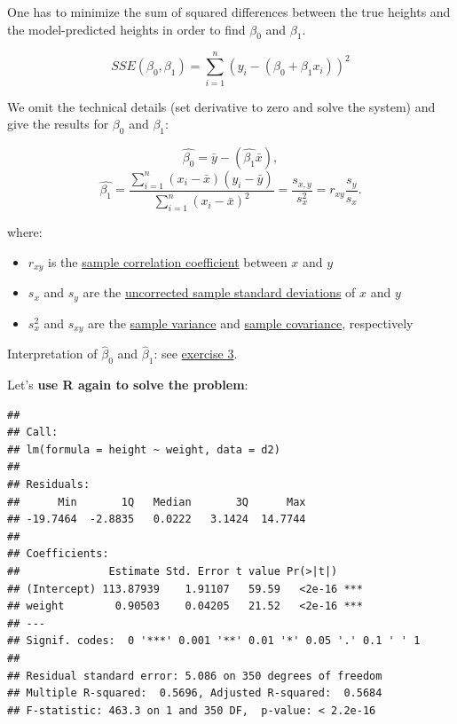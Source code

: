 \documentclass[
]{book}
\newenvironment{Shaded}{\begin{snugshade}}{\end{snugshade}}
\newcommand{\AttributeTok}[1]{\textcolor[rgb]{0.13,0.29,0.53}{#1}}
\newcommand{\DecValTok}[1]{\textcolor[rgb]{0.00,0.00,0.81}{#1}}
\newcommand{\FunctionTok}[1]{\textcolor[rgb]{0.13,0.29,0.53}{\textbf{#1}}}
\newcommand{\NormalTok}[1]{#1}
\newcommand{\OtherTok}[1]{\textcolor[rgb]{0.56,0.35,0.01}{#1}}
\newcommand{\SpecialCharTok}[1]{\textcolor[rgb]{0.81,0.36,0.00}{\textbf{#1}}}
\providecommand{\tightlist}{%
  \setlength{\itemsep}{0pt}\setlength{\parskip}{0pt}}
\begin{document}
One has to minimize the sum of squared differences between the true heights and
the model-predicted heights in order to find \(\beta_0\) and \(\beta_1\).

\[ SSE(\beta_0, \beta_1) = \sum_{i=1}^n (y_i - (\beta_0 + \beta_1 x_i))^2 \]

We omit the technical details (set derivative to zero and solve the system) and give the results for \(\beta_0\) and \(\beta_1\):

\[
\hat{\beta_0} = \bar{y} - (\hat{\beta_1} \bar{x}),
\]
\[
\hat{\beta_1} = \frac{\sum_{i=1}^n (x_i - \bar{x})(y_i - \bar{y})}{\sum_{i=1}^n (x_i - \bar{x})^2} =
 \frac{s_{x,y}}{s_x^2} = r_{xy} \frac{s_y}{s_x}.
\]

where:

\begin{itemize}
\tightlist
\item
  \(r_{xy}\) is the \href{https://en.wikipedia.org/wiki/Pearson_correlation_coefficient}{sample correlation coefficient} between \(x\) and \(y\)
\item
  \(s_x\) and \(s_y\) are the \href{https://en.wikipedia.org/wiki/Standard_deviation}{uncorrected sample standard deviations} of \(x\) and \(y\)
\item
  \(s_x^2\) and \(s_{xy}\) are the \href{https://en.wikipedia.org/wiki/Variance}{sample variance} and \href{https://en.wikipedia.org/wiki/Covariance}{sample covariance}, respectively
\end{itemize}

Interpretation of \(\hat{\beta}_0\) and \(\hat{\beta}_1\): see \hyperref[exercise3_simpl_lin_reg]{exercise 3}.

Let's \textbf{use R again to solve the problem}:

\begin{Shaded}
\end{Shaded}

\begin{verbatim}
## 
## Call:
## lm(formula = height ~ weight, data = d2)
## 
## Residuals:
##      Min       1Q   Median       3Q      Max 
## -19.7464  -2.8835   0.0222   3.1424  14.7744 
## 
## Coefficients:
##              Estimate Std. Error t value Pr(>|t|)    
## (Intercept) 113.87939    1.91107   59.59   <2e-16 ***
## weight        0.90503    0.04205   21.52   <2e-16 ***
## ---
## Signif. codes:  0 '***' 0.001 '**' 0.01 '*' 0.05 '.' 0.1 ' ' 1
## 
## Residual standard error: 5.086 on 350 degrees of freedom
## Multiple R-squared:  0.5696, Adjusted R-squared:  0.5684 
## F-statistic: 463.3 on 1 and 350 DF,  p-value: < 2.2e-16
\end{verbatim}
\end{document}
